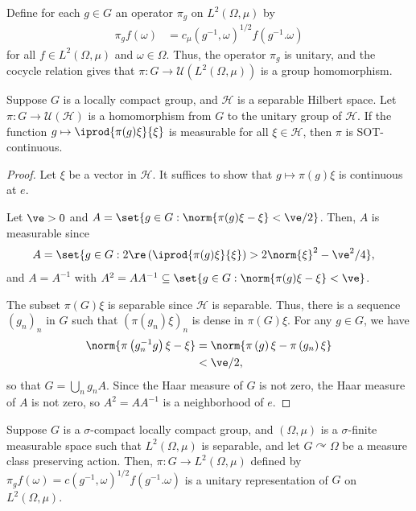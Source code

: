 \documentclass[10pt]{mypackage}
\begin{document}
Define for each $g\in G$ an operator $\pi_g$ on $L^2\left( \Omega,\mu \right)$ by
\begin{align*}
  \pi_gf(\omega) &= c_{\mu}\left( g^{-1},\omega \right)^{1/2}f\left( g^{-1}.\omega \right)
\end{align*}
for all $f\in L^2\left( \Omega,\mu \right)$ and $\omega\in \Omega$. Thus, the operator $\pi_g$ is unitary, and the cocycle relation gives that $\pi\colon G\to \mathcal{U}\left( L^2\left( \Omega,\mu \right) \right)$ is a group homomorphism.
\begin{lemma}
  Suppose $G$ is a locally compact group, and $\mathscr{H}$ is a separable Hilbert space. Let $\pi\colon G\to \mathcal{U}\left( \mathscr{H} \right)$ is a homomorphism from $G$ to the unitary group of $ \mathscr{H} $. If the function $g\mapsto \iprod{\pi(g)\xi}{\xi}$ is measurable for all $\xi\in \mathscr{H}$, then $\pi$ is SOT-continuous.
\end{lemma}
\begin{proof}
  Let $\xi$ be a vector in $ \mathscr{H} $. It suffices to show that $g\mapsto \pi(g)\xi$ is continuous at $e$.

  Let $\ve > 0$ and $A = \set{g\in G : \norm{\pi(g)\xi - \xi} < \ve/2}$. Then, $A$ is measurable since
  \begin{align*}
    A &= \set{g\in G : 2\re\left( \iprod{\pi(g)\xi}{\xi} \right) > 2\norm{\xi}^2-\ve^2/4},
  \end{align*}
  and $A = A^{-1}$ with $A^2 = AA^{-1}\subseteq \set{g\in G : \norm{\pi(g)\xi -\xi} < \ve}$.

  The subset $\pi(G)\xi$ is separable since $ \mathscr{H} $ is separable. Thus, there is a sequence $\left( g_n \right)_n$ in $G$ such that $\left( \pi\left( g_n \right)\xi \right)_{n}$ is dense in $\pi(G)\xi$. For any $g\in G$, we have
  \begin{align*}
    \norm{\pi\left( g_n^{-1}g \right)\xi - \xi} &= \norm{\pi\left( g \right)\xi - \pi\left( g_n \right)\xi}\\
                                                &< \ve/2,
  \end{align*}
  so that $G = \bigcup_{n}g_nA$. Since the Haar measure of $G$ is not zero, the Haar measure of $A$ is not zero, so $A^2 = AA^{-1}$ is a neighborhood of $e$.
\end{proof}
\begin{proposition}
  Suppose $G$ is a $\sigma$-compact locally compact group, and $\left( \Omega,\mu \right)$ is a $\sigma$-finite measurable space such that $L^2\left( \Omega,\mu \right)$ is separable, and let $G\curvearrowright \Omega$ be a measure class preserving action. Then, $\pi\colon G\to L^2\left( \Omega,\mu \right)$ defined by $\pi_gf(\omega) = c\left( g^{-1},\omega \right)^{1/2}f\left( g^{-1}.\omega \right)$ is a unitary representation of $G$ on $L^2\left( \Omega,\mu \right)$.
\end{proposition}
\end{document}
